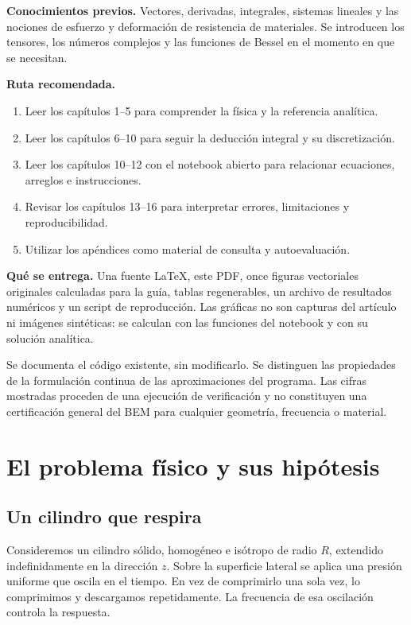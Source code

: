 \documentclass[11pt,a4paper]{report}
\numberwithin{equation}{chapter}
\begin{document}
\textbf{Conocimientos previos.} Vectores, derivadas, integrales, sistemas
lineales y las nociones de esfuerzo y deformaci\'on de resistencia de
materiales. Se introducen los tensores, los n\'umeros complejos y las funciones
de Bessel en el momento en que se necesitan.

\textbf{Ruta recomendada.}
\begin{enumerate}
  \item Leer los cap\'itulos 1--5 para comprender la f\'isica y la referencia
  anal\'itica.
  \item Leer los cap\'itulos 6--10 para seguir la deducci\'on integral y su
  discretizaci\'on.
  \item Leer los cap\'itulos 10--12 con el notebook abierto para relacionar
  ecuaciones, arreglos e instrucciones.
  \item Revisar los cap\'itulos 13--16 para interpretar errores,
  limitaciones y reproducibilidad.
  \item Utilizar los ap\'endices como material de consulta y autoevaluaci\'on.
\end{enumerate}

\textbf{Qu\'e se entrega.} Una fuente \LaTeX{}, este PDF, once figuras
vectoriales originales calculadas para la gu\'ia, tablas regenerables,
un archivo de resultados num\'ericos y un script de reproducci\'on.
Las gr\'aficas no son capturas del art\'iculo ni im\'agenes sint\'eticas:
se calculan con las funciones del notebook y con su soluci\'on anal\'itica.

\begin{cuidado}
Se documenta el c\'odigo existente, sin modificarlo. Se distinguen las
propiedades de la formulaci\'on continua de las aproximaciones del programa.
Las cifras mostradas proceden de una ejecuci\'on de verificaci\'on y no
constituyen una certificaci\'on general del BEM para cualquier geometr\'ia,
frecuencia o material.
\end{cuidado}

\tableofcontents
\listoffigures
\listoftables
\clearpage
{}

\chapter{El problema f\'isico y sus hip\'otesis}
\label{ch:problema}

\section{Un cilindro que respira}
Consideremos un cilindro s\'olido, homog\'eneo e is\'otropo de radio $R$,
extendido indefinidamente en la direcci\'on $z$. Sobre la superficie lateral
se aplica una presi\'on uniforme que oscila en el tiempo. En vez de
comprimirlo una sola vez, lo comprimimos y descargamos repetidamente.
La frecuencia de esa oscilaci\'on controla la respuesta.
\end{document}
